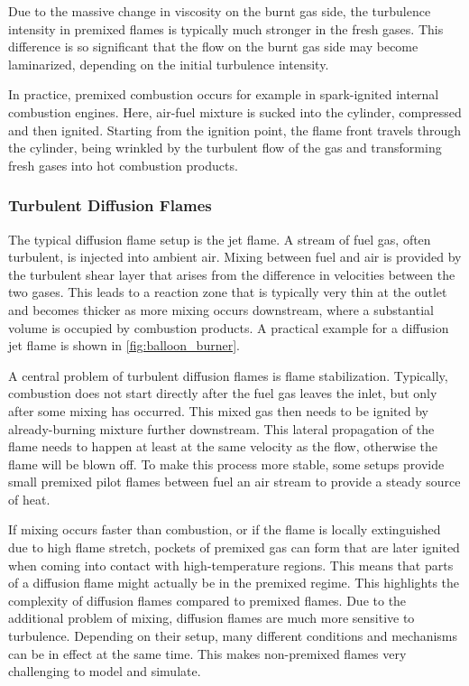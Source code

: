 %
Due to the massive change in viscosity on the burnt gas side, the turbulence
intensity in premixed flames is typically much stronger in the fresh gases.
%
This difference is so significant that the flow on the burnt gas side may become
laminarized, depending on the initial turbulence intensity.
%

%
In practice, premixed combustion occurs for example in spark-ignited internal
combustion engines.
%
Here, air-fuel mixture is sucked into the cylinder, compressed and then ignited.
%
Starting from the ignition point, the flame front travels through the cylinder,
being wrinkled by the turbulent flow of the gas and transforming fresh gases
into hot combustion products.
%
%
\subsubsection{Turbulent Diffusion Flames} %
\label{ssub:turbulent_diffusion_flames}
%
The typical diffusion flame setup is the jet flame.
%
A stream of fuel gas, often turbulent, is injected into ambient air.
%
Mixing between fuel and air is provided by the turbulent shear layer that arises
from the difference in velocities between the two gases.
%
This leads to a reaction zone that is typically very thin at the outlet and
becomes thicker as more mixing occurs downstream, where a substantial volume is
occupied by combustion products.
%
A practical example for a diffusion jet flame is shown in
\cref{fig:balloon_burner}.
%

%
A central problem of turbulent diffusion flames is flame stabilization.
%
Typically, combustion does not start directly after the fuel gas leaves the
inlet, but only after some mixing has occurred.
%
This mixed gas then needs to be ignited by already-burning mixture further
downstream.
%
This lateral propagation of the flame needs to happen at least at the same
velocity as the flow, otherwise the flame will be blown off.
%
To make this process more stable, some setups provide small premixed pilot
flames between fuel an air stream to provide a steady source of heat.
%

%
If mixing occurs faster than combustion, or if the flame is locally extinguished
due to high flame stretch, pockets of premixed gas can form that are later
ignited when coming into contact with high-temperature regions.
%
This means that parts of a diffusion flame might actually be in the premixed
regime.
%
This highlights the complexity of diffusion flames compared to premixed flames.
%
Due to the additional problem of mixing, diffusion flames are much more
sensitive to turbulence.
%
Depending on their setup, many different conditions and mechanisms can be in
effect at the same time.
%
This makes non-premixed flames very challenging to model and simulate.
%
%
%
%
